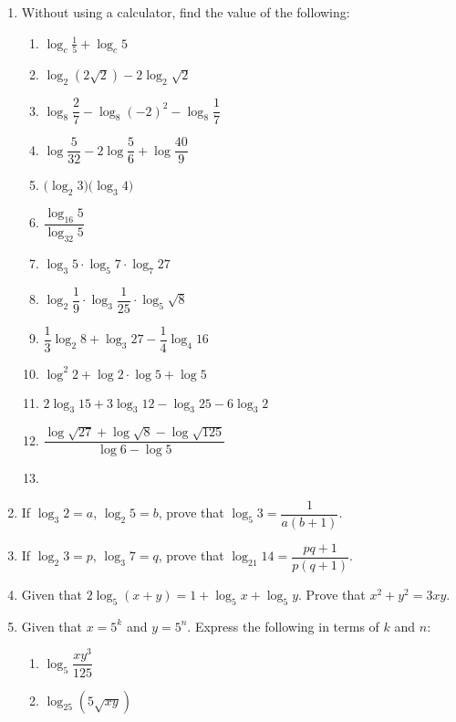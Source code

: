\documentclass[12pt]{report}
\begin{document}
\begin{multicols}{2}
\begin{enumerate}
    \item Without using a calculator, find the value of the following:
          \begin{enumerate}
            \item $\log_{c}{\frac{1}{5}}+\log_{c}5$
            \item $\log_{2}\left(2{\sqrt{2}}\right)-2\log_{2}{\sqrt{2}}$
            \item $\log_8{\dfrac{2}{7}}-\log_{8}(-2)^{2}-\log_{8}{\dfrac{1}{7}}$
            \item $\log{\dfrac{5}{32}}-2\log{\dfrac{5}{6}}+\log{\dfrac{40}{9}}$
            \item ${\big(}\log_{2}3{\big)}{\big(}\log_{3}4{\big)}$
            \item $\dfrac{\log_{16}5}{\log_{32}5}$
            \item $\log_{3}5\cdot\log_{5}7\cdot\log_{7}27$
            \item $\log_{2}{\dfrac{1}{9}}\cdot\log_{3}{\dfrac{1}{25}}\cdot\log_{5}\sqrt8$
            \item $\dfrac{1}{3}\log_{2}8+\log_{3}27-\dfrac{1}{4}\log_{4}16$
            \item $\log^{2}2+\log2\cdot\log5+\log5$
            \item $2\log_{3}15+3\log_{3}12-\log_{3}25-6\log_{3}2$
            \item ${\dfrac{\log{\sqrt{27}}+\log{\sqrt{8}}-\log{\sqrt{125}}}{\log6-\log5}}$
            \item {}
          \end{enumerate}

    \item If $\log_3 2 = a$, $\log_2 5 = b$, prove that $\log_5 3 = \dfrac{1}{a(b+1)}$.
    \item If $\log_2 3 = p$, $\log_3 7 = q$, prove that $\log_21 14 =
            \dfrac{pq+1}{p(q+1)}$.
    \item Given that $2\log_5(x+y) = 1 + \log_5 x + \log_5 y$. Prove that $x^2 + y^2 =
            3xy$.
    \item Given that $x = 5^k$ and $y = 5^n$. Express the following in terms of $k$ and
          $n$:
          \begin{enumerate}
            \item $\log_{5}{\dfrac{xy^3}{125}}$
            \item $\log_{25}\left(5{\sqrt{xy}}\right)$
          \end{enumerate}


\end{enumerate}
\end{multicols}
\end{document}
